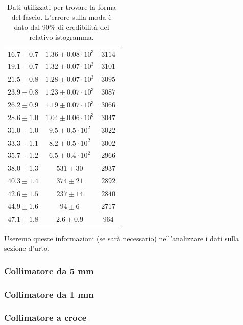 \begin{table}[h]
\begin{tabular}{c|c|c}
$ 16.7 \pm 0.7 $ & $ 1.36 \pm 0.08  \cdot 10^{3} $ & $ 3114 $ \\ 
$ 19.1 \pm 0.7 $ & $ 1.32 \pm 0.07  \cdot 10^{3} $ & $ 3101 $ \\ 
$ 21.5 \pm 0.8 $ & $ 1.28 \pm 0.07  \cdot 10^{3} $ & $ 3095 $ \\ 
$ 23.9 \pm 0.8 $ & $ 1.23 \pm 0.07  \cdot 10^{3} $ & $ 3087 $ \\ 
$ 26.2 \pm 0.9 $ & $ 1.19 \pm 0.07  \cdot 10^{3} $ & $ 3066 $ \\ 
$ 28.6 \pm 1.0 $ & $ 1.04 \pm 0.06  \cdot 10^{3} $ & $ 3047 $ \\ 
$ 31.0 \pm 1.0 $ & $ 9.5 \pm 0.5    \cdot 10^{2} $ & $ 3022 $ \\ 
$ 33.3 \pm 1.1 $ & $ 8.2 \pm 0.5    \cdot 10^{2} $ & $ 3002 $ \\ 
$ 35.7 \pm 1.2 $ & $ 6.5 \pm 0.4    \cdot 10^{2} $ & $ 2966 $ \\ 
$ 38.0 \pm 1.3 $ & $ 531 \pm 30 $ & $ 2937 $ \\ 
$ 40.3 \pm 1.4 $ & $ 374 \pm 21 $ & $ 2892 $ \\ 
$ 42.6 \pm 1.5 $ & $ 237 \pm 14 $ & $ 2840 $ \\ 
$ 44.9 \pm 1.6 $ & $ 94 \pm 6 $ & $ 2717 $ \\ 
$ 47.1 \pm 1.8 $ & $ 2.6 \pm 0.9 $ & $ 964 $ \\ 
\end{tabular}

\caption{Dati utilizzati per trovare la forma del fascio. L'errore sulla moda è dato dal 90\% di credibilità del relativo istogramma.}

\end{table}

Useremo queste informazioni (se sarà necessario) nell'analizzare i dati sulla sezione d'urto.

\subsubsection{Collimatore da 5\! mm}

\subsubsection{Collimatore da 1\! mm}

\subsubsection{Collimatore a croce}



